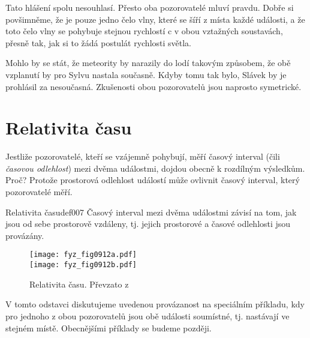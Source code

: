       Tato hlášení spolu nesouhlasí. Přesto oba pozorovatelé mluví pravdu. Dobře si povšimněme, že
      je pouze jedno čelo vlny, které se šíří z místa každé události, a že toto čelo vlny se
      pohybuje stejnou rychlostí c v obou vztažných soustavách, přesně tak, jak si to žádá postulát
      rychlosti světla.

      Mohlo by se stát, že meteority by narazily do lodí takovým způsobem, že obě vzplanutí by pro
      Sylvu nastala současně. Kdyby tomu tak bylo, Slávek by je prohlásil za nesoučasná. Zkušenosti
      obou pozorovatelů jsou naprosto symetrické.
  
  \section{Relativita času}
    Jestliže pozorovatelé, kteří se vzájemně pohybují, měří časový interval (čili \emph{časovou
    odlehlost}) mezi dvěma událostmi, dojdou obecně k rozdílným výsledkům. Proč? Protože prostorová
    odlehlost událostí může ovlivnit časový interval, který pozorovatelé měří.  
    
    \begin{fyzdef}{Relativita času}{def007}
      Časový interval mezi dvěma událostmi závisí na tom, jak jsou od sebe prostorově vzdáleny, tj.
      jejich prostorové a časové odlehlosti jsou provázány.
    \end{fyzdef}

    \begin{figure}[ht!]  %
      \centering
          {\texttt{[image: fyz\_fig0912a.pdf]}}                                 \\    
          {\texttt{[image: fyz\_fig0912b.pdf]}}        
      \caption{Relativita času. Převzato z \cite[s.~1011]{Halliday2001}}
      \label{fyz:fig0912}
    \end{figure}

    V tomto odstavci diskutujeme uvedenou provázanost na speciálním příkladu, kdy pro jednoho z obou
    pozorovatelů jsou obě události soumístné, tj. nastávají ve stejném místě. Obecnějšími příklady
    se budeme později.


